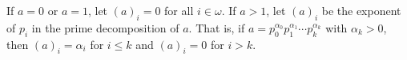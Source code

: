 If $a = 0$ or $a = 1$, let $(a)_i = 0$ for all $i \in \omega$. If $a > 1$, let $(a)_i$ be the exponent of $p_i$ in the prime decomposition of $a$. That is, if $a = p_0^{\alpha_0} p_1^{\alpha_1} \cdots p_k^{\alpha_k}$ with $\alpha_k > 0$, then $(a)_i = \alpha_i$ for $i \leq k$ and $(a)_i = 0$ for $i > k$.
